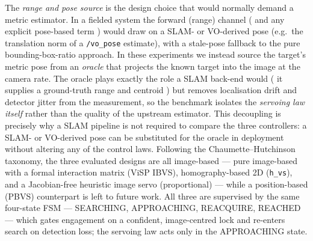 The \emph{range and pose source} is the design choice that would normally
demand a metric estimator. In a fielded system the forward (range) channel (
and any explicit pose-based term ) would draw on a SLAM- or VO-derived pose
(e.g.\ the translation norm of a \texttt{/vo\_pose} estimate), with a
stale-pose fallback to the pure bounding-box-ratio approach. In these
experiments we instead source the target's metric pose from an \emph{oracle}
that projects the known target into the image at the camera rate. The oracle
plays exactly the role a SLAM back-end would ( it supplies a ground-truth
range and centroid ) but removes localisation drift and detector jitter from
the measurement, so the benchmark isolates the \emph{servoing law itself}
rather than the quality of the upstream estimator. This decoupling is precisely
why a SLAM pipeline is not required to compare the three controllers: a SLAM-
or VO-derived pose can be substituted for the oracle in deployment without
altering any of the control laws. Following the Chaumette--Hutchinson taxonomy,
the three evaluated designs are all image-based --- pure image-based with a
formal interaction matrix (ViSP IBVS), homography-based 2D (\texttt{h\_vs}),
and a Jacobian-free heuristic image servo (proportional) --- while a
position-based (PBVS) counterpart is left to future work. All three are
supervised by the same four-state FSM
--- SEARCHING, APPROACHING, REACQUIRE, REACHED --- which gates engagement on a
confident, image-centred lock and re-enters search on detection loss; the
servoing law acts only in the APPROACHING state.

